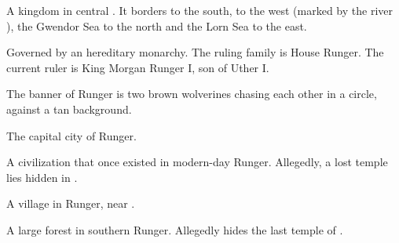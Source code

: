\begin{gloss}
\begin{comment}
\paragraph{Runger}
\end{comment}
A kingdom in central . 
It borders  to the south,  to the west (marked by the river ), the Gwendor Sea to the north and the Lorn Sea to the east. 


Governed by an hereditary monarchy. 
The ruling family is House Runger. 
The current ruler is King {Morgan Runger} I, son of Uther I. 

The banner of Runger is two brown wolverines chasing each other in a circle, against a tan background.





\begin{subgloss}
  \begin{comment}
  \subparagraph{Dormina}
  \end{comment}
  The capital city of Runger.
  
  
  
  
  
  
  \begin{comment}
  \subparagraph{\EreshKal}
  \end{comment}
  \gitem{\EreshKal}
  \index{\EreshKal}
  A  civilization that once existed in modern-day Runger.
  Allegedly, a lost \EreshKali{} temple lies hidden in .  

  
  
  
  
  
  \begin{comment}
  \subparagraph{Gedrock}
  \end{comment}
  A village in Runger, near . 
  
  
  
  
  
  
  \begin{comment}
  \subparagraph{Waythane Forest}
  \end{comment}
  A large forest in southern Runger. 
  Allegedly hides the last temple of . 


\end{subgloss}
\end{gloss}
